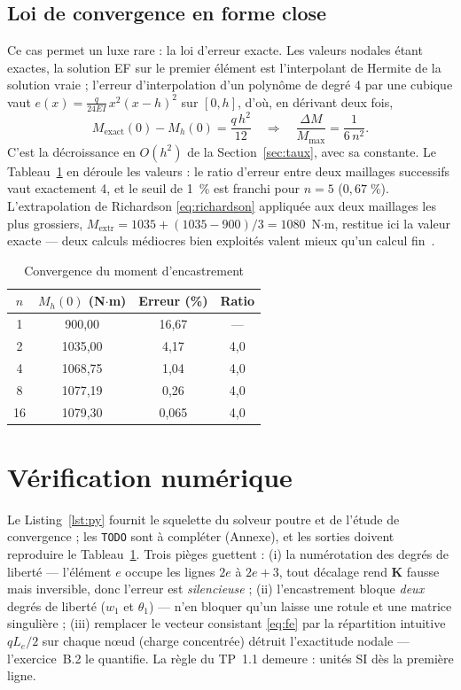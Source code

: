 \documentclass[10pt,journal]{IEEEtran}
\begin{document}
\subsection{Loi de convergence en forme close}
Ce cas permet un luxe rare : la loi d'erreur exacte. Les valeurs nodales étant exactes, la solution EF sur le premier élément est l'interpolant de Hermite de la solution vraie ; l'erreur d'interpolation d'un polynôme de degré 4 par une cubique vaut $e(x)=\frac{q}{24EI}\,x^2(x-h)^2$ sur $[0,h]$, d'où, en dérivant deux fois,
\begin{equation}
M_{\text{exact}}(0)-M_h(0) = \frac{q\,h^2}{12}
\quad\Longrightarrow\quad
\frac{\Delta M}{M_{\max}} = \frac{1}{6\,n^2}.
\label{eq:loi}
\end{equation}
C'est la décroissance en $O(h^2)$ de la Section~\ref{sec:taux}, avec sa constante. Le Tableau~\ref{tab:conv} en déroule les valeurs : le ratio d'erreur entre deux maillages successifs vaut exactement 4, et le seuil de 1~\% est franchi pour $n=5$ ($0{,}67\;\%$). L'extrapolation de Richardson \eqref{eq:richardson} appliquée aux deux maillages les plus grossiers, $M_{\text{extr}} = 1035 + (1035-900)/3 = 1080$~N$\cdot$m, restitue ici la valeur exacte --- deux calculs médiocres bien exploités valent mieux qu'un calcul fin~\cite{oberkampf}.

\begin{table}[!t]
\caption{Convergence du moment d'encastrement}
\label{tab:conv}
\centering
\begin{tabular}{@{}cccc@{}}
\toprule
$n$ & $M_h(0)$ (N$\cdot$m) & Erreur (\%) & Ratio \\
\midrule
1 & 900,00 & 16,67 & --- \\
2 & 1035,00 & 4,17 & 4,0 \\
4 & 1068,75 & 1,04 & 4,0 \\
8 & 1077,19 & 0,26 & 4,0 \\
16 & 1079,30 & 0,065 & 4,0 \\
\bottomrule
\end{tabular}
\end{table}

\section{Vérification numérique}
Le Listing~\ref{lst:py} fournit le squelette du solveur poutre et de l'étude de convergence ; les \texttt{TODO} sont à compléter (Annexe), et les sorties doivent reproduire le Tableau~\ref{tab:conv}. Trois pièges guettent : (i) la numérotation des degrés de liberté --- l'élément $e$ occupe les lignes $2e$ à $2e+3$, tout décalage rend $\mathbf{K}$ fausse mais inversible, donc l'erreur est \emph{silencieuse} ; (ii) l'encastrement bloque \emph{deux} degrés de liberté ($w_1$ et $\theta_1$) --- n'en bloquer qu'un laisse une rotule et une matrice singulière ; (iii) remplacer le vecteur consistant \eqref{eq:fe} par la répartition intuitive $qL_e/2$ sur chaque n\oe{}ud (charge \og concentrée\fg{}) détruit l'exactitude nodale --- l'exercice~B.2 le quantifie. La règle du TP~1.1 demeure : unités SI dès la première ligne.
\end{document}
